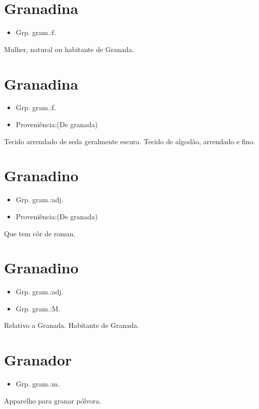 \section{Granadina}
\begin{itemize}
\item {Grp. gram.:f.}
\end{itemize}
Mulher, natural ou habitante de Granada.
\section{Granadina}
\begin{itemize}
\item {Grp. gram.:f.}
\end{itemize}
\begin{itemize}
\item {Proveniência:(De \textunderscore granada\textunderscore )}
\end{itemize}
Tecido arrendado de seda geralmente escura.
Tecido de algodão, arrendado e fino.
\section{Granadino}
\begin{itemize}
\item {Grp. gram.:adj.}
\end{itemize}
\begin{itemize}
\item {Proveniência:(De \textunderscore granada\textunderscore )}
\end{itemize}
Que tem côr de roman.
\section{Granadino}
\begin{itemize}
\item {Grp. gram.:adj.}
\end{itemize}
\begin{itemize}
\item {Grp. gram.:M.}
\end{itemize}
Relativo a Granada.
Habitante de Granada.
\section{Granador}
\begin{itemize}
\item {Grp. gram.:m.}
\end{itemize}
Apparelho para granar pólvora.
